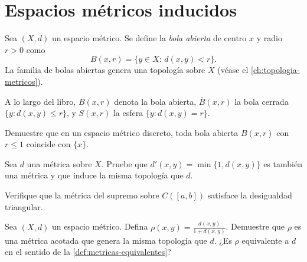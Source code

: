 \section{Espacios métricos inducidos}

\begin{definition}
\label{def:metrica-inducida-topologia}
Sea $(X,d)$ un espacio métrico. Se define la \emph{bola abierta} de centro $x$ y radio $r>0$ como
\[
  B(x,r)=\{y\in X:\,d(x,y)<r\}.
\]
La familia de bolas abiertas genera una topología sobre $X$ (véase el \cref{ch:topologia-metricos}).
\end{definition}

\begin{notation}
\label{not:bolas}
A lo largo del libro, $B(x,r)$ denota la bola abierta, $\overline{B}(x,r)$ la bola cerrada $\{y:d(x,y)\leq r\}$, y $S(x,r)$ la esfera $\{y:d(x,y)=r\}$.
\end{notation}

\begin{exercise}
Demuestre que en un espacio métrico discreto, toda bola abierta $B(x,r)$ con $r\leq 1$ coincide con $\{x\}$.
\end{exercise}

\begin{exercise}
Sea $d$ una métrica sobre $X$. Pruebe que $d'(x,y)=\min\{1,d(x,y)\}$ es también una métrica y que induce la misma topología que $d$.
\end{exercise}

\begin{exercise}
Verifique que la métrica del supremo sobre $C([a,b])$ satisface la desigualdad triangular.
\end{exercise}

\begin{problem}
Sea $(X,d)$ un espacio métrico. Defina $\rho(x,y)=\frac{d(x,y)}{1+d(x,y)}$. Demuestre que $\rho$ es una métrica acotada que genera la misma topología que $d$. ¿Es $\rho$ equivalente a $d$ en el sentido de la \cref{def:metricas-equivalentes}?
\end{problem}
